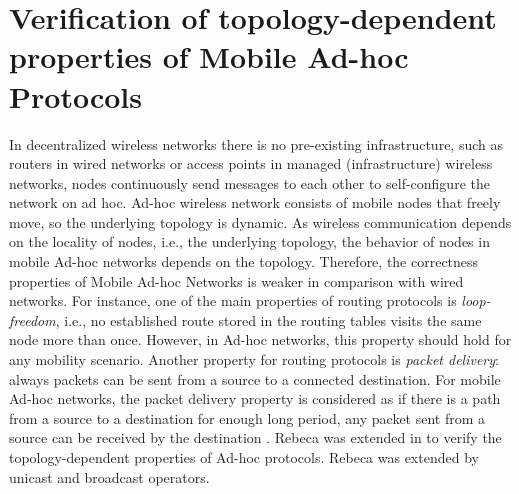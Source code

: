 \section{Verification of topology-dependent properties of Mobile Ad-hoc Protocols}\label{sec::wrebeca} 
	In decentralized wireless networks there is no pre-existing infrastructure, such as routers in wired networks or access points in managed (infrastructure) wireless networks, nodes continuously send messages to each other to self-configure the network on ad hoc. %
	Ad-hoc wireless network consists of mobile nodes that freely move, so the underlying topology is dynamic. As wireless communication depends on the locality of nodes, i.e., the underlying topology, the behavior of nodes in mobile Ad-hoc networks depends on the topology. Therefore, the correctness properties of Mobile Ad-hoc Networks is weaker in comparison with wired networks. For instance, one of the main properties of routing protocols is \emph{loop-freedom}, i.e., no established route stored in the routing tables visits the same node more than once. However, in Ad-hoc networks, this property should hold for any mobility scenario. Another property for routing protocols is \emph{packet delivery}: always packets can be sent from a source to a connected destination. For mobile Ad-hoc networks, the packet delivery property is considered as if there is a path from a source to a destination for enough long period, any packet sent from a source can be received by the destination \cite{GlabbeekAWN}. Rebeca was extended in \cite{FOAC} to verify the topology-dependent properties of Ad-hoc protocols. Rebeca was extended by unicast and broadcast operators. %
	
